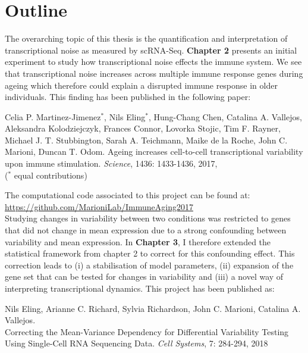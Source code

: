 

\section{Outline}

The overarching topic of this thesis is the quantification and interpretation of transcriptional noise as measured by scRNA-Seq. 
\textbf{Chapter 2} presents an initial experiment to study how  transcriptional noise effects the immune system. 
We see that transcriptional noise increases across multiple immune response genes during ageing which therefore could explain a disrupted immune response in older individuals. 
This finding has been published in the following paper:

\begin{Abstract}
\hspace{-5mm} Celia P. Martinez-Jimenez$^\ast$, Nils  Eling$^\ast$, Hung-Chang Chen, Catalina A. Vallejos, Aleksandra Kolodziejczyk, Frances Connor, Lovorka Stojic, Tim F. Rayner, Michael J. T. Stubbington, Sarah A. Teichmann, Maike de la Roche, John C. Marioni, Duncan T. Odom. 
Ageing increases cell-to-cell transcriptional variability upon immune stimulation. \emph{Science}, 1436: 1433-1436, 2017, \\
($^\ast$ equal contributions) 
\end{Abstract}

The computational code associated to this project can be found at:\\
\url{https://github.com/MarioniLab/ImmuneAging2017}\\

Studying changes in variability between two conditions was restricted to genes that did not change in mean expression due to a strong confounding between variability and mean expression. 
In \textbf{Chapter 3}, I therefore extended the statistical framework from chapter 2 to correct for this confounding effect. 
This correction leads to (i) a stabilisation of model parameters, (ii) expansion of the gene set that can be tested for changes in variability and (iii) a novel way of interpreting transcriptional dynamics. 
This project has been published as:

\begin{Abstract}
\hspace{-5mm} Nils Eling, Arianne C. Richard, Sylvia Richardson, John C. Marioni, Catalina A. Vallejos. \\
Correcting the Mean-Variance Dependency for Differential Variability Testing Using Single-Cell RNA Sequencing Data. \emph{Cell Systems}, 7: 284-294, 2018
\end{Abstract}

